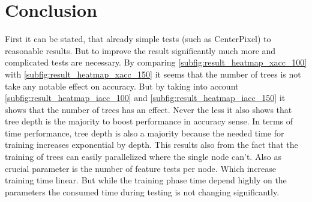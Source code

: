 \section{Conclusion}
\label{sec:conclusion}

First it can be stated, that already simple tests (such as CenterPixel) to reasonable results. But to improve the result significantly much more and complicated tests are necessary.
By comparing \ref{subfig:result_heatmap_xacc_100} with \ref{subfig:result_heatmap_xacc_150} it seems that the number of trees is not take any notable effect on accuracy. But by taking into account \ref{subfig:result_heatmap_iacc_100} and \ref{subfig:result_heatmap_iacc_150} it shows that the number of trees has an effect. Never the less it also shows that tree depth is the majority to boost performance in accuracy sense. In terms of time performance, tree depth is also a majority because the needed time for training increases exponential by depth. This results also from the fact that the training of trees can easily parallelized where the single node can't. Also as crucial parameter is the number of feature tests per node. Which increase training time linear. But while the training phase time depend highly on the parameters the consumed time during testing is not changing significantly.

